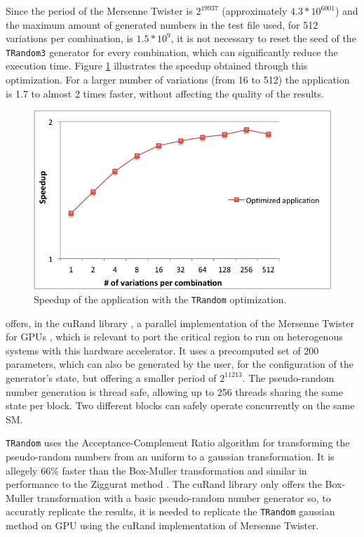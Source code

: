 Since the period of the Mersenne Twister is $2^{19937}$ (approximately $4.3 * 10^{6001}$) and the maximum amount of generated numbers in the test file used, for 512 variations per combination, is $1.5 * 10^{9}$, it is not necessary to reset the seed of the \texttt{TRandom3} generator for every combination, which can significantly reduce the \ttDilepKinFit execution time. Figure \ref{fig:TRandomOptim} illustrates the speedup obtained through this optimization. For a larger number of variations (from 16 to 512) the application is 1.7 to almost 2 times faster, without affecting the quality of the results.

\begin{figure}[!htp]
	\begin{center}
		\includegraphics[scale=0.7]{../../common/graphs/speedup_trandom_optim.png}  
		\caption{Speedup of the \tth application with the \texttt{TRandom} optimization.}
		\label{fig:TRandomOptim}
	\end{center}
\end{figure}

\nvidia offers, in the cuRand library \cite{NVIDIA:cuRand}, a parallel implementation of the Mersenne Twister for GPUs \cite{NVIDIA:MersenneTwister}, which is relevant to port the critical region to run on heterogenous systems with this hardware accelerator. It uses a precomputed set of 200 parameters, which can also be generated by the user, for the configuration of the generator's state, but offering a smaller period of $2^{11213}$. The pseudo-random number generation is thread safe, allowing up to 256 threads sharing the same state per block. Two different blocks can safely operate concurrently on the same SM.

\texttt{TRandom} uses the Acceptance-Complement Ratio algorithm \cite{AcceptanceRandom} for transforming the pseudo-random numbers from an uniform to a gaussian transformation. It is allegely 66\% faster than the Box-Muller transformation \cite{BoxMuller} and similar in performance to the Ziggurat method \cite{Ziggurat}. The cuRand library only offers the Box-Muller transformation with a basic pseudo-random number generator so, to accuratly replicate the results, it is needed to replicate the \texttt{TRandom} gaussian method on GPU using the cuRand implementation of Mersenne Twister.

